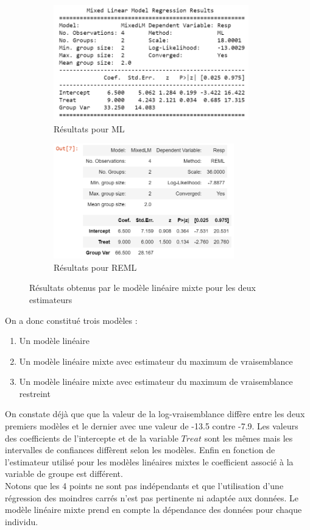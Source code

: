 \begin{figure}[h]

\begin{subfigure}{0.5\textwidth}
\includegraphics[width=0.9\linewidth, height=5cm]{sortie ML.png} 
\caption{Résultats pour ML}
\label{fig:subim1}
\end{subfigure}
\begin{subfigure}{0.5\textwidth}
\includegraphics[width=0.9\linewidth, height=5cm]{sortie REML.png}
\caption{Résultats pour REML}
\label{fig:subim2}
\end{subfigure}

\caption{Résultats obtenus par le modèle linéaire mixte pour les deux estimateurs}
\label{fig:image2}
\end{figure}

On a donc constitué trois modèles :

\begin{enumerate}
    \item Un modèle linéaire
    \item Un modèle linéaire mixte avec estimateur du maximum de vraisemblance
    \item Un modèle linéaire mixte avec estimateur du maximum de vraisemblance restreint
\end{enumerate}

On constate déjà que que la valeur de la log-vraisemblance diffère entre les deux premiers modèles et le dernier avec une valeur de -13.5 contre -7.9. Les valeurs des coefficients de l'intercepte et de la variable $Treat$ sont les mêmes mais les intervalles de confiances diffèrent selon les modèles. Enfin en fonction de l'estimateur utilisé pour les modèles linéaires mixtes le coefficient associé à la variable de groupe est différent.\\
Notons que les 4 points ne sont pas indépendants et que l'utilisation d'une régression des moindres carrés n'est pas pertinente ni adaptée aux données. Le modèle linéaire mixte prend en compte la dépendance des données pour chaque individu.

